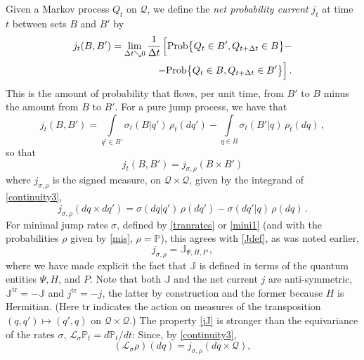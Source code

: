 \documentclass[12pt]{article}
\newcommand{\1}{\mathbf{1}} %
\newcommand{\tr}{\mathrm{tr}} %
\newcommand{\conf}{\mathcal{Q}} %
\newcommand{\prob}{\mathrm{Prob}}
\newcommand{\measure}{\mathbb{P}} %
\newcommand{\current}{\mathbb{J}}
\newcommand{\generator}{\mathscr{L}} %
\newcommand{\pov}{{P}}%
\begin{document}
Given a Markov process $Q_t$ on $\conf$, we define the \emph{net
probability current} $j_t$ at time $t$ between sets $B$ and $B'$ by
\begin{eqnarray}\label{jdefcont}
     j_t(B,B') = \lim_{\Delta t \searrow 0} \frac{1}{\Delta t}
\hspace{-3ex}
   &&
     \Big[ \prob\big\{Q_{t}\in B',Q_{t+\Delta t}\in B  \big\} -
   \\\nonumber
   &&
   - \prob \big\{ Q_{t}\in B, Q_{t+\Delta t} \in B' \big\} \Big]\,.
\end{eqnarray}
This is the amount of probability that flows, per unit time, from $B'$
to $B$ minus the amount from $B$ to $B'$.  For a pure jump process, we
have that
\begin{equation}\label{jrate}
   j_t(B,B') = \int\limits_{q'\in B'} \sigma_t(B|q')\, \rho_t(dq') -
   \int\limits_{q\in B} \sigma_t(B'|q)\, \rho_t(dq)\,,
\end{equation}
so that
\begin{equation}
j_t(B,B') = j_{\sigma,\rho}(B \times B')
\end{equation}
where $j_{\sigma,\rho}$ is the signed measure, on $\conf \times
\conf$, given by the integrand of \eqref{continuity3},
\begin{equation}\label{jsigma}
   j_{\sigma,\rho} (dq \times dq') = \sigma(dq|q') \, \rho(dq') -
   \sigma(dq'|q) \, \rho(dq)\,.
\end{equation}
For minimal jump rates $\sigma$, defined by \eqref{tranrates} or
\eqref{mini1} (and with the probabilities $\rho$ given by \eqref{mis},
$\rho = \measure$), this agrees with \eqref{Jdef}, as was noted
earlier,
\begin{equation}\label{jJ}
   j_{\sigma,\rho} = \current_{\Psi,H,\pov} \,,
\end{equation}
where we have made explicit the fact that $\current$ is defined in
terms of the quantum entities $\Psi, H$, and $\pov$. Note that both
$\current$ and the net current $j$ are anti-symmetric, $\current^\tr =
-\current$ and $j^\tr = -j$, the latter by construction and the former
because $H$ is Hermitian. (Here $\tr$ indicates the action on measures
of the transposition $(q,q') \mapsto (q',q)$ on $\conf \times \conf$.)
The property \eqref{jJ} is stronger than the equivariance of the rates
$\sigma$, $\generator_\sigma \measure_t = d\measure_t / dt$: Since, by
\eqref{continuity3},
\begin{equation}
   (\generator_\sigma \rho) (dq) = j_{\sigma,\rho} (dq \times \conf),
\end{equation}
\end{document}

